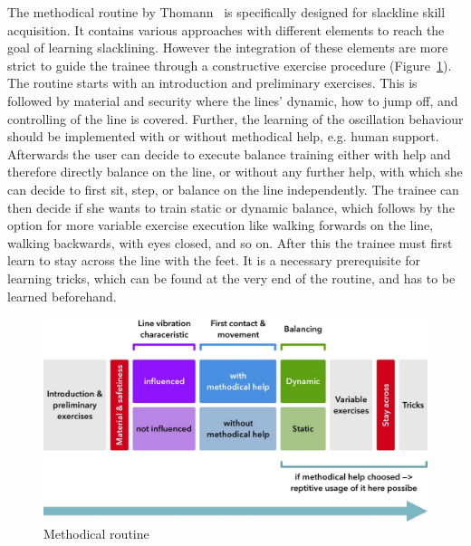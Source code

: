 The methodical routine by Thomann~\cite{Thomann2013-aa} is specifically designed for slackline skill acquisition. It contains various approaches with different elements to reach the goal of learning slacklining. However the integration of these elements are more strict to guide the trainee through a constructive exercise procedure (Figure~\ref{fig:3_3_1_methodicalRoutine}). The routine starts with an introduction and preliminary exercises. This is followed by material and security where the lines' dynamic, how to jump off, and controlling of the line is covered. Further, the learning of the oscillation behaviour should be implemented with or without methodical help, e.g. human support. Afterwards the user can decide to execute balance training either with help and therefore directly balance on the line, or without any further help, with which she can decide to first sit, step, or balance on the line independently.
The trainee can then decide if she wants to train static or dynamic balance, which follows by the option for more variable exercise execution like walking forwards on the line, walking backwards, with eyes closed, and so on. After this the trainee must first learn to stay across the line with the feet. It is a necessary prerequisite for learning tricks, which can be found at the very end of the routine, and has to be learned beforehand.
\begin{figure}[htb]
	\centering
	\begin{minipage}[t]{1\linewidth}
		\centering
		\includegraphics[width=1\linewidth]{Pictures/3_3_1_methodicalRoutine3}
		\caption{Methodical routine~\cite{Thomann2013-aa}}
		\label{fig:3_3_1_methodicalRoutine}
	\end{minipage}
\end{figure}

